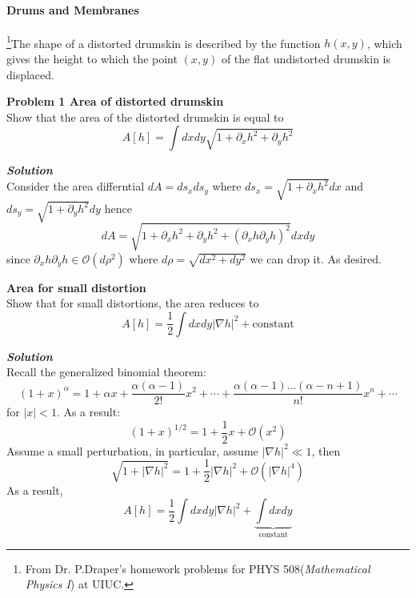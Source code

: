 \paragraph{Drums and Membranes }

\footnote{From Dr. P.Draper's homework problems for PHYS 508(\textit{Mathematical Physics I}) at UIUC.}The shape of a distorted drumskin is described by the
function $h(x, y)$, which gives the height to which the point $(x, y)$ of the flat undistorted drumskin is displaced.

\begin{framed}
\textbf{\textbf{Problem 1} Area of distorted drumskin}\\
Show that the area of the distorted drumskin is equal to
\begin{equation}
A[h] = \int dxdy \sqrt{1 + \partial_x h^2 + \partial_y h^2}
\end{equation}
\end{framed}

\begin{framed}
\textbf{\textit{Solution}}\\
Consider the area differntial $dA=ds_x ds_y$ where $ds_x=\sqrt{1+\partial_x h^2}dx$ and $ds_y=\sqrt{1+\partial_y h^2}dy$ hence
\begin{equation}
dA=\sqrt{1+\partial_x h^2 + \partial_y h^2 + (\partial_x h\partial_y h)^2}dxdy
\end{equation}
since $\partial_x h\partial_y h\in \mathcal{O}(d\rho^2)$ where $d\rho = \sqrt{dx^2 + dy^2}$ we can drop it. As desired.
\end{framed}

\begin{framed}
\textbf{Area for small distortion}\\
Show that for small distortions, the area reduces to
\begin{equation}
\label{afsd}
   A[h]=\frac{1}{2}\int dxdy |\nabla h|^2 + \text{constant}
\end{equation}
\end{framed}

\begin{framed}
\textbf{\textit{Solution}}\\
Recall the generalized binomial theorem:
\begin{equation}
(1+x)^{\alpha}=1+\alpha x + \frac{\alpha(\alpha-1)}{2!}x^2+\cdots + \frac{\alpha(\alpha-1)...(\alpha-n+1)}{n!}x^n + \cdots
\end{equation}
for $|x|<1$.
As a result:
\begin{equation}
(1+x)^{1/2}=1+\frac12 x + \mathcal{O}(x^2)
\end{equation}
Assume a small perturbation, in particular, assume $|\nabla h|^2 \ll 1$, then
\begin{equation}
\sqrt{1+|\nabla h|^2} = 1 + \frac12 |\nabla h|^2 +  \mathcal{O}(|\nabla h|^4)
\end{equation}
As a result,
\begin{equation}
A[h]=\frac12 \int dxdy |\nabla h|^2 + \underbrace{\int dxdy}_{\text{constant}}
\end{equation}
\end{framed}

